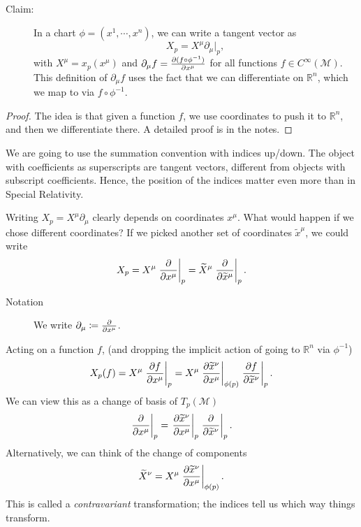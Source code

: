 \begin{description}
  \item[Claim:] In a chart $\phi= (x^1, \cdots, x^n)$, we can write a tangent vector as
    \begin{equation}
      X_p = X^\mu \partial_\mu \rvert_p,
    \end{equation}
    with $X^\mu = x_p(x^\mu)$ and $\partial_\mu f = \pdv{(f \circ \phi^{-1})}{x^\mu}$ for all functions $f \in C^\infty(\mathcal{M})$. This definition of $\partial_\mu f$ uses the fact that we can differentiate on $\mathbb{R}^n$, which we map to via $f \circ \phi^{-1}$.
\end{description}
\begin{proof}
  The idea is that given a function $f$, we use coordinates to push it to $\mathbb{R}^n$, and then we differentiate there.
  A detailed proof is in the notes.
\end{proof}

\begin{leftbar}
  \begin{remark}
    We are going to use the summation convention with indices up/down.
    The object with coefficients as superscripts are tangent vectors, different from objects with subscript coefficients. Hence, the position of the indices matter even more than in Special Relativity.
  \end{remark}
\end{leftbar}

Writing $X_p = X^\mu \partial_\mu$ clearly depends on coordinates $x^\mu$. What would happen if we chose different coordinates?
If we picked another set of coordinates $\widetilde x^\mu$, we could write
\begin{equation}
  X_p = X^\mu \left.\pdv{}{x^\mu}\right\rvert_p = \widetilde X^\mu \left.\pdv{}{\widetilde x^\mu}\right\rvert_p.
\end{equation}
\begin{description}
  \item[Notation] We write $\partial_\mu \coloneqq \pdv{}{x^\mu}$.
\end{description}
Acting on a function $f$, (and dropping the implicit action of going to $\mathbb{R}^n$ via $\phi^{-1}$)
\begin{equation}
  X_p(f) = X^\mu \left.\pdv{f}{x^\mu} \right\rvert_p = X^\mu \left.\pdv{\widetilde x^\nu}{x^\mu} \right\rvert_{\phi(p)} \left.\pdv{f}{\widetilde x^\nu} \right\rvert_p.
\end{equation}
We can view this as a change of basis of $T_p(\mathcal{M})$
\begin{equation}
 \left. \pdv{}{x^\mu} \right\rvert_p = \left.\pdv{\widetilde x^\nu}{x^\mu}\right\rvert_p \left.\pdv{}{\widetilde x^\nu} \right\rvert_p.
\end{equation}
Alternatively, we can think of the change of components
\begin{equation}
  \widetilde X^\nu = X^\mu \left.\pdv{\widetilde x^\nu}{x^\mu} \right\rvert_{\phi(p)}.
\end{equation}
This is called a \emph{contravariant} transformation; the indices tell us which way things transform.

